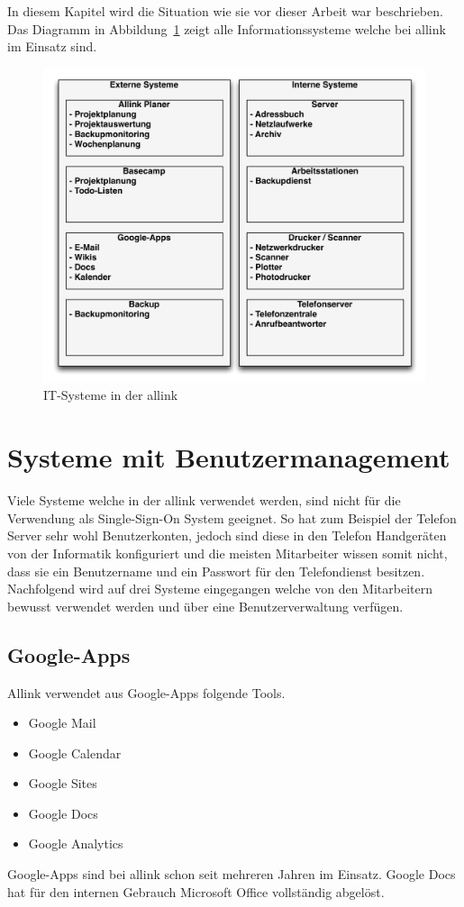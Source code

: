 In diesem Kapitel wird die Situation wie sie vor dieser Arbeit war beschrieben. Das Diagramm in Abbildung~\ref{fig:systemlandschaft} zeigt alle Informationssysteme welche bei allink im Einsatz sind.
\begin{figure}[h]
  \centering
	\includegraphics[width=1\textwidth]{include/systemlandschaft.pdf}
	\caption{IT-Systeme in der allink}
	\label{fig:systemlandschaft}
\end{figure}


\section{Systeme mit Benutzermanagement}
\label{sec:Systeme mit Benutzermanagement}
Viele Systeme welche in der allink verwendet werden, sind nicht für die Verwendung als Single-Sign-On System geeignet. So hat zum Beispiel der Telefon Server sehr wohl Benutzerkonten, jedoch sind diese in den Telefon Handgeräten von der Informatik konfiguriert und die meisten Mitarbeiter wissen somit nicht, dass sie ein Benutzername und ein Passwort für den Telefondienst besitzen. Nachfolgend wird auf drei Systeme eingegangen welche von den Mitarbeitern bewusst verwendet werden und über eine Benutzerverwaltung verfügen.

\subsection{Google-Apps}
\label{subs:Google-Apps}
Allink verwendet aus Google-Apps folgende Tools. 
\begin{itemize}
	\item Google Mail 
	\item Google Calendar 
	\item Google Sites 
	\item Google Docs 
	\item Google Analytics 
\end{itemize}
Google-Apps sind bei allink schon seit mehreren Jahren im Einsatz. Google Docs hat für den internen Gebrauch Microsoft Office vollständig abgelöst.

